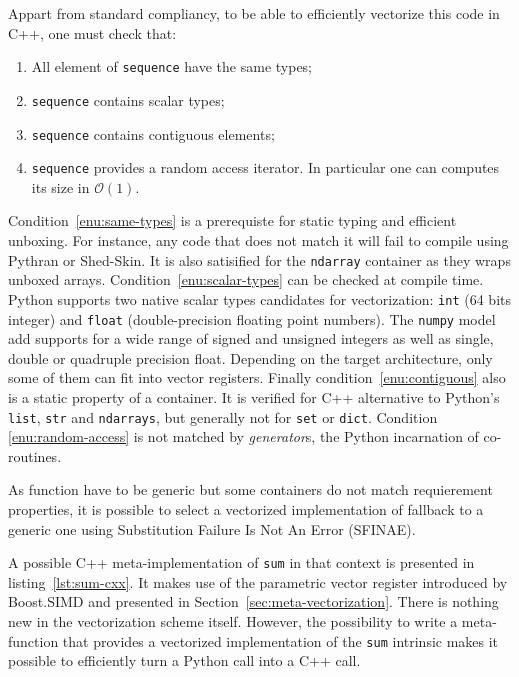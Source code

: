 \documentclass[preprint]{sigplanconf}
\begin{document}
Appart from standard compliancy, to be able to efficiently vectorize this code in C++, one must check that:

\begin{enumerate}
    \item\label{enu:same-types} All element of \texttt{sequence} have the same types;
    \item\label{enu:scalar-types} \texttt{sequence} contains scalar types;
    \item\label{enu:contiguous} \texttt{sequence} contains contiguous elements;
    \item\label{enu:random-access} \texttt{sequence} provides a random access iterator. In particular one can computes its size in $\mathcal{O}(1)$.
\end{enumerate}

Condition~\ref{enu:same-types} is a prerequiste for static typing and efficient
unboxing. For instance, any code that does not match it will fail to compile
using Pythran or Shed-Skin. It is also satisified for the \texttt{ndarray}
container as they wraps unboxed arrays. Condition~\ref{enu:scalar-types} can be
checked at compile time. Python supports two native scalar types candidates for
vectorization: \texttt{int} (64 bits integer) and \texttt{float}
(double-precision floating point numbers). The \texttt{numpy} model add supports for a
wide range of signed and unsigned integers as well as single, double or
quadruple precision float. Depending on the target architecture, only some of
them can fit into vector registers. Finally condition~\ref{enu:contiguous} also
is a static property of a container. It is verified for C++ alternative to
Python's \texttt{list}, \texttt{str} and \texttt{ndarrays}, but generally not
for \texttt{set} or \texttt{dict}. Condition \ref{enu:random-access} is not
matched by \emph{generator}s, the Python incarnation of co-routines.


As function have to be generic but some containers do not match requierement
properties, it is possible to select a vectorized
implementation of fallback to a generic one using Substitution Failure
Is Not An Error (SFINAE).

A possible C++ meta-implementation of \texttt{sum} in that context is presented
in listing~\ref{lst:sum-cxx}. It makes use of the parametric vector register
introduced by Boost.SIMD and presented in Section~\ref{sec:meta-vectorization}.
There is nothing new in the vectorization scheme itself. However, the
possibility to write a meta-function that provides a vectorized implementation
of the \texttt{sum} intrinsic makes it possible to efficiently turn a Python
call into a C++ call.
\end{document}

